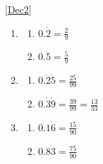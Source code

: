 \documentclass[a4paper,12pt]{article}
\begin{document}
\ref{Dec2}
		\begin{multicols}{3}
	\begin{enumerate}
		\item 
		\begin{enumerate}
			\item $\displaystyle 0.\dot{2}=\frac{2}{9}$
			\item $\displaystyle 0.\dot{5}=\frac{5}{9}$
		\end{enumerate}
		\item 
		\begin{enumerate}
			\item $\displaystyle 0.\dot{2}\dot{5}=\frac{25}{99}$
			\item $\displaystyle 0.\dot{3}\dot{9}=\frac{39}{99}=\frac{13}{33}$
		\end{enumerate}
		\item 
		\begin{enumerate}
			\item $\displaystyle 0.1\dot{6}=\frac{15}{90}$
			\item $\displaystyle 0.8\dot{3}=\frac{75}{90}$
		\end{enumerate}
	\end{enumerate}
\end{multicols}
\normalsize







 
\end{document}
